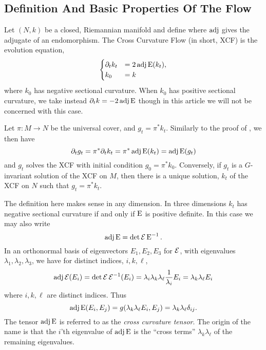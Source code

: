 \documentclass[a4paper,12pt]{amsart}
\begin{document}
\subsection{Definition And Basic Properties Of The Flow}
\label{subsec:xcf_defn}

Let \((N, k)\) be a closed, Riemannian manifold and define
where $\operatorname{adj}$ gives the adjugate of an endomorphism. The Cross Curvature Flow (in short, XCF) is the evolution equation,
\begin{equation}
\label{eq:xcf}
\begin{cases}
\partial_t k_t  &= 2 \operatorname{adj}\operatorname{E}(k_t), \\
k_0 &= k
\end{cases}
\end{equation}
where \(k_0\) has negative sectional curvature. When \(k_0\) has positive sectional curvature, we take instead \(\partial_t k = -2\operatorname{adj}\operatorname{E}\) though in this article we will not be concerned with this case.
\begin{rem}
Let \(\pi : M \to N\) be the universal cover, and \(g_t = \pi^{\ast} k_t\). Similarly to the proof of , we then have
\[
\partial_t g_t = \pi^{\ast} \partial_t k_t = \pi^{\ast} \operatorname{adj}\operatorname{E}(k_t) = \operatorname{adj}\operatorname{E}(g_t)
\]
and \(g_t\) solves the XCF with initial condition \(g_0 = \pi^{\ast} k_0\). Conversely, if \(g_t\) is a \(G\)-invariant solution of the XCF on \(M\), then there is a unique solution, \(k_t\) of the XCF on \(N\) such that \(g_t = \pi^{\ast} k_t\).
\end{rem}

The definition here makes sense in any dimension. In three dimensions \(k_t\) has negative sectional curvature if and only if \(\operatorname{E}\) is positive definite. In this case we may also write
\[
\operatorname{adj}\operatorname{E} = \det \operatorname{\mathcal{E}} \operatorname{E}^{-1}.
\]
In an orthonormal basis of eigenvectors \(E_1, E_2, E_3\) for \(\operatorname{\mathcal{E}}\), with eigenvalues \(\lambda_1, \lambda_2, \lambda_3\), we have for distinct indices, \(i, k, \ell\),
\[
\operatorname{adj}\operatorname{\mathcal{E}} (E_i) = \det\operatorname{\mathcal{E}} \operatorname{\mathcal{E}}^{-1}(E_i) = \lambda_i \lambda_k \lambda_{\ell} \frac{1}{\lambda_i} E_i = \lambda_k \lambda_{\ell} E_i
\]
where \(i,k,\ell\) are distinct indices. Thus
\[
\operatorname{adj}\operatorname{E}(E_i, E_j) = g(\lambda_k \lambda_{\ell} E_i, E_j) = \lambda_k \lambda_{\ell} \delta_{ij}.
\]
The tensor \(\operatorname{adj}\operatorname{E}\) is referred to as the \emph{cross curvature tensor}. The origin of the name is that the \(i\)'th eigenvalue of \(\operatorname{adj}\operatorname{E}\) is the ``cross terms'' \(\lambda_k \lambda_{\ell}\) of the remaining eigenvalues.
\end{document}
